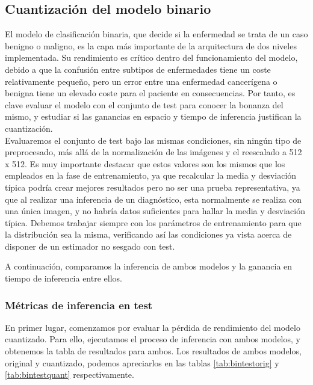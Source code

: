 \subsection{Cuantización del modelo binario}

El modelo de clasificación binaria, que decide si la enfermedad se trata de un caso benigno o maligno, es la capa más importante de la arquitectura de dos niveles implementada. Su rendimiento es crítico dentro del funcionamiento del modelo, debido a que la confusión entre subtipos de enfermedades tiene un coste relativamente pequeño, pero un error entre una enfermedad cancerígena o benigna tiene un elevado coste para el paciente en consecuencias. Por tanto, es clave evaluar el modelo con el conjunto de test para conocer la bonanza del mismo, y estudiar si las ganancias en espacio y tiempo de inferencia justifican la cuantización.\\

Evaluaremos el conjunto de test bajo las mismas condiciones, sin ningún tipo de preprocesado, más allá de la normalización de las imágenes y el reescalado a 512 x 512. Es muy importante destacar que estos valores son los mismos que los empleados en la fase de entrenamiento, ya que recalcular la media y desviación típica podría crear mejores resultados pero no ser una prueba representativa, ya que al realizar una inferencia de un diagnóstico, esta normalmente se realiza con una única imagen, y no habría datos suficientes para hallar la media y desviación típica. Debemos trabajar siempre con los parámetros de entrenamiento para que la distribución sea la misma, verificando así las condiciones ya vista acerca de disponer de un estimador no sesgado con test.

A continuación, comparamos la inferencia de ambos modelos y la ganancia en tiempo de inferencia entre ellos.

\subsubsection{Métricas de inferencia en test}

En primer lugar, comenzamos por evaluar la pérdida de rendimiento del modelo cuantizado. Para ello, ejecutamos el proceso de inferencia con ambos modelos, y obtenemos la tabla de resultados para ambos.
Los resultados de ambos modelos, original y cuantizado, podemos apreciarlos en las tablas \ref{tab:bintestorig} y \ref{tab:bintestquant} respectivamente.

